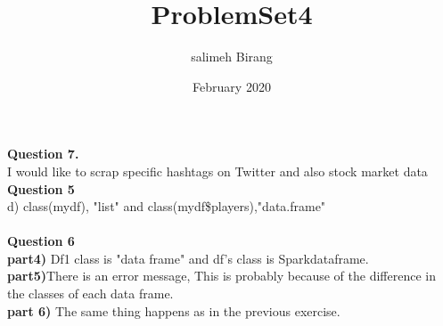 \documentclass{article}
\title{ProblemSet4}
\author{salimeh Birang }
\date{February 2020}
\begin{document}
\maketitle
\noindent
\textbf{Question 7.}\\
I would like to scrap specific hashtags on Twitter and also stock market data \\

\noindent
\textbf{Question 5}\\
d) class(mydf), "list" and class(mydf\$players),"data.frame"\\
\\
\noindent
\textbf{Question 6}\\
\textbf{part4)} Df1 class is "data frame" and df's class is Sparkdataframe.\\
\textbf{part5)}There is an error message,
This is probably because of the difference in the classes of each data frame.\\
\textbf{part 6)} The same thing happens as in the previous exercise.\\
\end{document}
